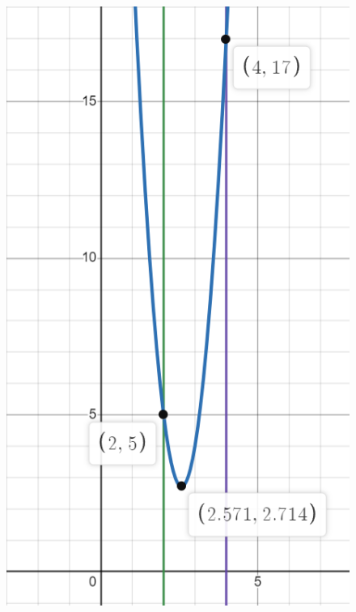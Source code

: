 \documentclass[12pt,a4paper]{ctexart}
\begin{document}
\begin{itemize}
\begin{figure}[!h]
{            \includegraphics[scale=0.5]{image/L(x,6).png}}
\end{figure}
\end{itemize}
\end{document}
